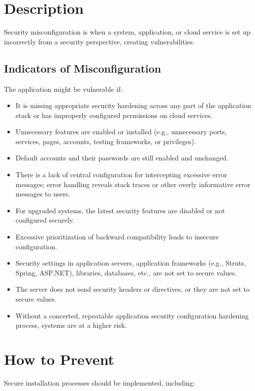 \documentclass[11pt]{article}
\begin{document}
\section{Description}
Security misconfiguration is when a system, application, or cloud service is set up incorrectly from a security perspective, creating vulnerabilities.

\subsection{Indicators of Misconfiguration}
The application might be vulnerable if:

\begin{itemize}
  \item It is missing appropriate security hardening across any part of the application stack or has improperly configured permissions on cloud services.
  \item Unnecessary features are enabled or installed (e.g., unnecessary ports, services, pages, accounts, testing frameworks, or privileges).
  \item Default accounts and their passwords are still enabled and unchanged.
  \item There is a lack of central configuration for intercepting excessive error messages; error handling reveals stack traces or other overly informative error messages to users.
  \item For upgraded systems, the latest security features are disabled or not configured securely.
  \item Excessive prioritization of backward compatibility leads to insecure configuration.
  \item Security settings in application servers, application frameworks (e.g., Struts, Spring, ASP.NET), libraries, databases, etc., are not set to secure values.
  \item The server does not send security headers or directives, or they are not set to secure values.
  \item Without a concerted, repeatable application security configuration hardening process, systems are at a higher risk.
\end{itemize}

\section{How to Prevent}
Secure installation processes should be implemented, including:
\end{document}
